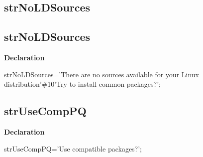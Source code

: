 \documentclass{report}
\newif\ifpdf
\begin{document}
\subsection*{\large{\textbf{strNoLDSources}}\normalsize\hspace{1ex}\hrulefill}
\else
\subsection*{strNoLDSources}
\fi
\label{trstrings-strNoLDSources}
\begin{list}{}{
\setlength{\itemindent}{0cm}
\setlength{\listparindent}{0cm}
\setlength{\leftmargin}{\evensidemargin}
\addtolength{\leftmargin}{\tmplength}
\settowidth{\labelsep}{X}
\addtolength{\leftmargin}{\labelsep}
\setlength{\labelwidth}{\tmplength}
}
\item[\textbf{Declaration}\hfill]
\ifpdf
\begin{flushleft}
\fi
\begin{ttfamily}
strNoLDSources='There are no sources available for your Linux distribution'{\#}10'Try to install common packages?';\end{ttfamily}

\ifpdf
\end{flushleft}
\fi

\end{list}
\ifpdf
\subsection*{\large{\textbf{strUseCompPQ}}\normalsize\hspace{1ex}\hrulefill}
\else
\subsection*{strUseCompPQ}
\fi
\label{trstrings-strUseCompPQ}
\begin{list}{}{
\setlength{\itemindent}{0cm}
\setlength{\listparindent}{0cm}
\setlength{\leftmargin}{\evensidemargin}
\addtolength{\leftmargin}{\tmplength}
\settowidth{\labelsep}{X}
\addtolength{\leftmargin}{\labelsep}
\setlength{\labelwidth}{\tmplength}
}
\item[\textbf{Declaration}\hfill]
\ifpdf
\begin{flushleft}
\fi
\begin{ttfamily}
strUseCompPQ='Use compatible packages?';\end{ttfamily}

\ifpdf
\end{flushleft}
\fi

\end{list}
\ifpdf
\end{document}
